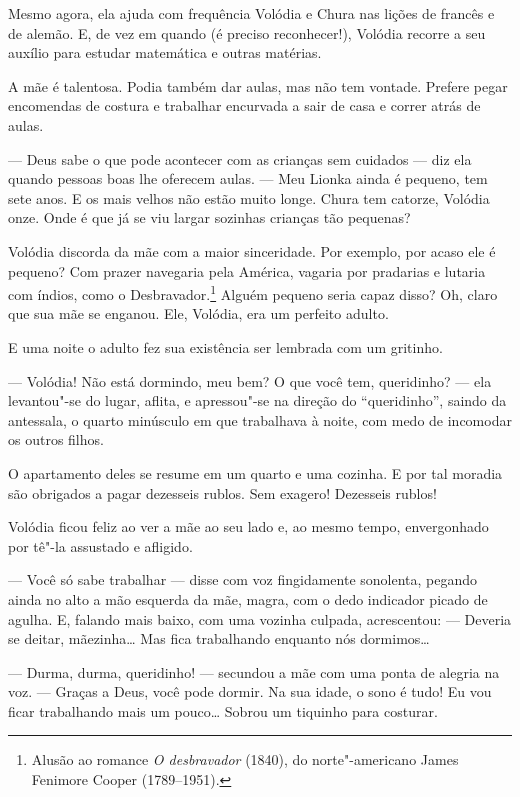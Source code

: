 Mesmo agora, ela ajuda com frequência Volódia e Chura nas lições de
francês e de alemão. E, de vez em quando (é preciso reconhecer!),
Volódia recorre a seu auxílio para estudar matemática e outras matérias.

A mãe é talentosa. Podia também dar aulas, mas não tem vontade. Prefere
pegar encomendas de costura e trabalhar encurvada a sair de casa e
correr atrás de aulas.

--- Deus sabe o que pode acontecer com as crianças sem cuidados --- diz
ela quando pessoas boas lhe oferecem aulas. --- Meu Lionka ainda é
pequeno, tem sete anos. E os mais velhos não estão muito longe. Chura
tem catorze, Volódia onze. Onde é que já se viu largar sozinhas crianças
tão pequenas?

Volódia discorda da mãe com a maior sinceridade. Por exemplo, por acaso
ele é pequeno? Com prazer navegaria pela América, vagaria por pradarias
e lutaria com índios, como o Desbravador.\footnote{Alusão ao romance
  \emph{O desbravador} (1840), do norte"-americano James Fenimore Cooper
  (1789--1951).} Alguém pequeno seria capaz disso? Oh, claro que sua mãe
se enganou. Ele, Volódia, era um perfeito adulto.

E uma noite o adulto fez sua existência ser lembrada com um gritinho.

--- Volódia! Não está dormindo, meu bem? O que você tem, queridinho? ---
ela levantou"-se do lugar, aflita, e apressou"-se na direção do
``queridinho'', saindo da antessala, o quarto minúsculo em que
trabalhava à noite, com medo de incomodar os outros filhos.

O apartamento deles se resume em um quarto e uma cozinha. E por tal
moradia são obrigados a pagar dezesseis rublos. Sem exagero! Dezesseis
rublos!

Volódia ficou feliz ao ver a mãe ao seu lado e, ao mesmo tempo,
envergonhado por tê"-la assustado e afligido.

--- Você só sabe trabalhar --- disse com voz fingidamente sonolenta,
pegando ainda no alto a mão esquerda da mãe, magra, com o dedo indicador
picado de agulha. E, falando mais baixo, com uma vozinha culpada,
acrescentou: --- Deveria se deitar, mãezinha\ldots{} Mas fica trabalhando
enquanto nós dormimos\ldots{}

--- Durma, durma, queridinho! --- secundou a mãe com uma ponta de
alegria na voz. --- Graças a Deus, você pode dormir. Na sua idade, o
sono é tudo! Eu vou ficar trabalhando mais um pouco\ldots{} Sobrou um
tiquinho para costurar.

